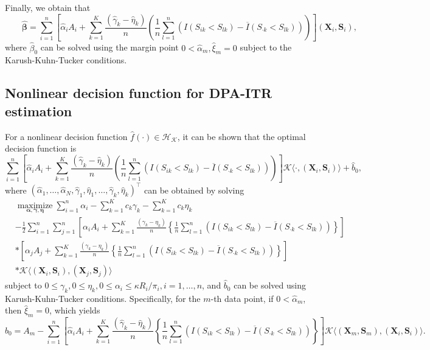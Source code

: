 \documentclass[12pt]{article}
\theoremstyle{plain}
\theoremstyle{definition}
\theoremstyle{remark}
\begin{document}
Finally, we obtain that
$$\qquad \widehat{\boldsymbol{\beta}}=\sum_{i=1}^n\left[\widehat{\alpha}_i A_i +\sum_{k=1}^K\frac{(\widehat{\gamma}_k-\widehat{\eta}_k)}{n}\left(\frac{1}{n}\sum_{l=1}^n\left(I\left({S}_{ik}<S_{lk}\right)-\overline{{I}}\left({S}_{\cdot k}<S_{lk}\right)\right)\right)\right] \left(\boldsymbol{X}_i,\boldsymbol{S}_i\right),$$
where $\widehat{\beta}_0$ can be solved using the margin point $0<\widehat{\alpha}_m, \widehat{\xi}_m=0$ subject to the Karush-Kuhn-Tucker conditions.


\subsection{Nonlinear decision function for DPA-ITR estimation}
For a nonlinear decision function $\widehat{f}(\cdot) \in \mathcal{H}_{\mathcal{K}}$, it can be shown that the optimal decision function is
$$
\sum_{i=1}^n\left[\widehat{\alpha}_i A_i +\sum_{k=1}^K\frac{(\widehat{\gamma}_k-\widehat{\eta}_k)}{n}\left(\frac{1}{n}\sum_{l=1}^n\left(I\left({S}_{ik}<S_{lk}\right)-\overline{{I}}\left({S}_{\cdot k}<S_{lk}\right)\right)\right)\right]  \mathcal{K}\langle \cdot, (\boldsymbol{X}_i,\boldsymbol{S}_i)\rangle+\widehat{b}_0,
$$
where $\left(\widehat{\alpha}_1, \ldots, \widehat{\alpha}_N,\widehat{\gamma}_1,\widehat{\eta}_1,  \ldots, \widehat{\gamma}_k,\widehat{\eta}_k \right)^\top$ can be obtained by  solving
\begin{equation}
\label{e17}
\begin{aligned}
&\underset{\boldsymbol{\alpha},  \boldsymbol{\gamma},  \boldsymbol{\eta}}{\operatorname{maximize}}
\sum_{i=1}^n \alpha_i
-\sum_{k=1}^Kc_k\gamma_k
-\sum_{k=1}^Kc_k\eta_k\\
&-\frac{1}{2}\sum_{i=1}^n\sum_{j=1}^n\left[\alpha_i A_i +\sum_{k=1}^K\frac{(\gamma_k-\eta_k)}{n}\left\{\frac{1}{n}\sum_{l=1}^n\left(I({S}_{ik}<S_{lk})-\overline{{I}}({S}_{\cdot k}<S_{lk})\right)\right\}\right]\\
&*\left[\alpha_j A_j +\sum_{k=1}^K\frac{(\gamma_k-\eta_k)}{n}\left\{\frac{1}{n}\sum_{l=1}^n\left(I({S}_{ik}<S_{lk})-\overline{{I}}({S}_{\cdot k}<S_{lk})\right)\right\}\right]\\
&*\mathcal{K} \langle(\boldsymbol{X}_i,\boldsymbol{S}_i),(\boldsymbol{X}_j,\boldsymbol{S}_j) \rangle
\end{aligned}
\end{equation}
subject to  $0\leq \gamma_k, 0\leq\eta_k, 0\leq \alpha_i \leq \kappa R_i / \pi_i, i=1, \ldots, n$, and $\widehat{b}_0$ can be solved using Karush-Kuhn-Tucker conditions. Specifically, for the $m$-th data point, if $0<\widehat{\alpha}_m$, then $\widehat{\xi}_m=0$, which yields {\small$$\widehat{b}_0= A_m-\sum_{i=1}^n\left[\widehat{\alpha}_i A_i +\sum_{k=1}^K\frac{(\widehat{\gamma}_k-\widehat{\eta}_k)}{n}\left\{\frac{1}{n}\sum_{l=1}^n\left(I\left({S}_{ik}<S_{lk}\right)-\overline{{I}}\left({S}_{\cdot k}<S_{lk}\right)\right)\right\}\right]  \mathcal{K}\langle (\boldsymbol{X}_m, \boldsymbol{S}_m), (\boldsymbol{X}_i,\boldsymbol{S}_i)\rangle.$$}
\end{document}
